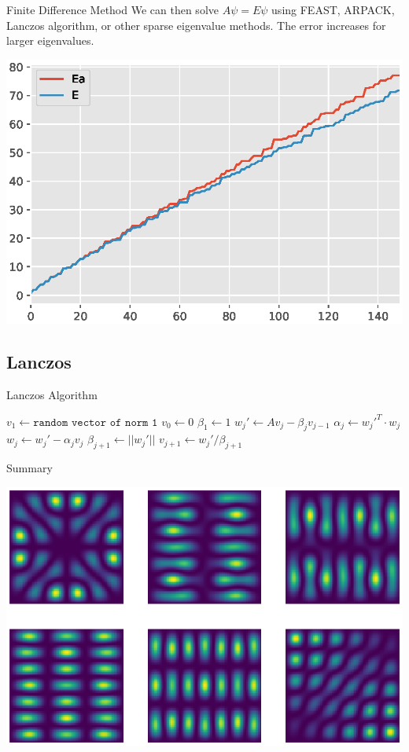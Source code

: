 \documentclass[mathserif]{beamer}
\begin{document}
\begin{frame}{Finite Difference Method}
We can then solve $A \psi = E \psi$ using FEAST, ARPACK, Lanczos algorithm, or other sparse eigenvalue methods. The error increases for larger eigenvalues. 

\center \includegraphics[scale=0.5]{EEa.eps}

\end{frame}


\subsection{Lanczos}

\begin{frame}{Lanczos Algorithm}

\begin{algorithmic}
\STATE $v_1 \gets \texttt{random vector of norm 1}$
\STATE $v_0 \gets 0$
\STATE $\beta_1 \gets 1$
    \STATE $w_j' \gets Av_j - \beta_j v_{j-1}$
    \STATE $\alpha_j \gets {w_j'}^T \cdot w_j$
    \STATE $w_j \gets w_j' - \alpha_j v_{j}$
    \STATE $\beta_{j+1} \gets ||w_j'||$
    \STATE $v_{j+1} \gets w_j'/\beta_{j+1}$
\ENDFOR
\end{algorithmic}

\end{frame}


\begin{frame}{Summary}

\center \includegraphics[scale=0.7]{what.eps}

\end{frame}
\end{document}
